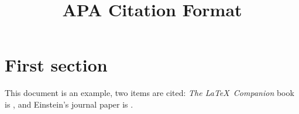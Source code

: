 \documentclass{article}
\title{APA Citation Format}
\begin{document}
\section{First section}

This document is an example, two items are cited: \textit{The \LaTeX\ Companion} book 
is \cite{Klenske2016}, and Einstein's journal paper is \cite{Bay1934}.


\printbibliography
\end{document}
